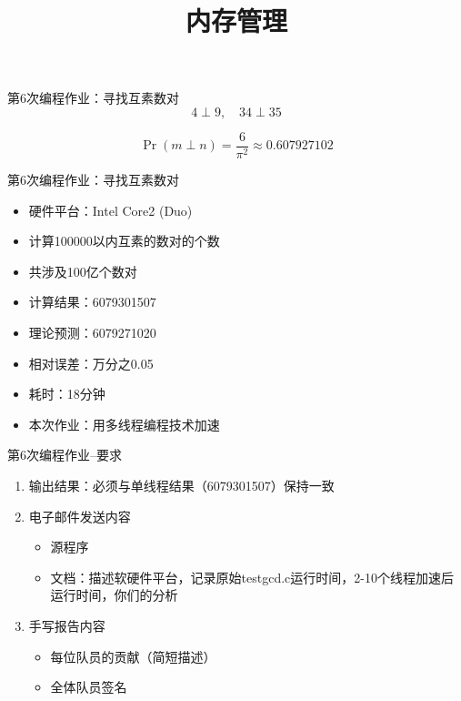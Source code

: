 \documentclass[xcolor=svgnames]{beamer}
\begin{document}
\begin{CJK*}{UTF8}{gbsn}


\title{内存管理}


\begin{frame}{第6次编程作业：寻找互素数对}
\begin{equation}
4 \perp 9, \quad 34 \perp 35
\end{equation}

\begin{equation}
\Pr(m \perp n) = \frac{6}{\pi^2} \approx 0.607927102
\end{equation}

\end{frame}

\begin{frame}{第6次编程作业：寻找互素数对}
\begin{itemize}
\item 硬件平台：Intel Core2 (Duo)
\item 计算100000以内互素的数对的个数
\item 共涉及100亿个数对
\item 计算结果：6079301507
\item 理论预测：6079271020
\item 相对误差：万分之0.05
\item 耗时：18分钟
\item 本次作业：用多线程编程技术加速
\end{itemize}
\end{frame}

\begin{frame}{第6次编程作业--要求}
\begin{enumerate}
\item 输出结果：必须与单线程结果（6079301507）保持一致
\item 电子邮件发送内容
\begin{itemize}
\item 源程序
\item 文档：描述软硬件平台，记录原始testgcd.c运行时间，2-10个线程加速后运行时间，你们的分析
\end{itemize}
\item 手写报告内容
\begin{itemize}
\item 每位队员的贡献（简短描述）
\item 全体队员签名
\end{itemize}
\end{enumerate}
\end{frame}


\end{CJK*}
\end{document}
